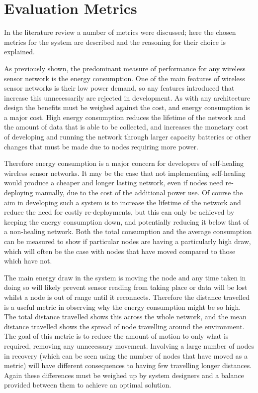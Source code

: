 \documentclass[authoryearcitations]{UoYCSproject}
\begin{document}
\section{Evaluation Metrics}

In the literature review a number of metrics were discussed; here the chosen metrics for the system are described and the reasoning for their choice is explained.

As previously shown, the predominant measure of performance for any wireless sensor network is the energy consumption. One of the main features of wireless sensor networks is their low power demand, so any features introduced that increase this unnecessarily are rejected in development. As with any architecture design the benefits must be weighed against the cost, and energy consumption is a major cost. High energy consumption reduces the lifetime of the network and the amount of data that is able to be collected, and increases the monetary cost of developing and running the network through larger capacity batteries or other changes that must be made due to nodes requiring more power.

Therefore energy consumption is a major concern for developers of self-healing wireless sensor networks. It may be the case that not implementing self-healing would produce a cheaper and longer lasting network, even if nodes need re-deploying manually, due to the cost of the additional power use. Of course the aim in developing such a system is to increase the lifetime of the network and reduce the need for costly re-deployments, but this can only be achieved by keeping the energy consumption down, and potentially reducing it below that of a non-healing network. Both the total consumption and the average consumption can be measured to show if particular nodes are having a particularly high draw, which will often be the case with nodes that have moved compared to those which have not.

The main energy draw in the system is moving the node and any time taken in doing so will likely prevent sensor reading from taking place or data will be lost whilst a node is out of range until it reconnects. Therefore the distance travelled is a useful metric in observing why the energy consumption might be so high. The total distance travelled shows this across the whole network, and the mean distance travelled shows the spread of node travelling around the environment. The goal of this metric is to reduce the amount of motion to only what is required, removing any unnecessary movement. Involving a large number of nodes in recovery (which can be seen using the number of nodes that have moved as a metric) will have different consequences to having few travelling longer distances. Again these differences must be weighed up by system designers and a balance provided between them to achieve an optimal solution.
\end{document}
